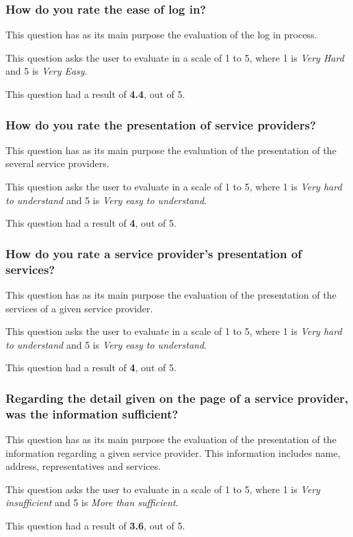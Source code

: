 \subsubsection{How do you rate the ease of log in?}
This question has as its main purpose the evaluation of the log in process. 
\par 
This question asks the user to evaluate in a scale of 1 to 5, where 1 is \textit{Very Hard} and 5 is \textit{Very Easy}. 
\par
This question had a result of \textbf{4.4}, out of 5. 

\subsubsection{How do you rate the presentation of service providers?}
This question has as its main purpose the evaluation of the presentation of the several service providers.
\par 
This question asks the user to evaluate in a scale of 1 to 5, where 1 is \textit{Very hard to understand} and 5 is \textit{Very easy to understand}. 
\par
This question had a result of \textbf{4}, out of 5. 

\subsubsection{How do you rate a service provider's presentation of services?}

This question has as its main purpose the evaluation of the presentation of the services of a given service provider.
\par 
This question asks the user to evaluate in a scale of 1 to 5, where 1 is \textit{Very hard to understand} and 5 is \textit{Very easy to understand}. 
\par
This question had a result of \textbf{4}, out of 5. 

\subsubsection{Regarding the detail given on the page of a service provider, was the information sufficient?}

This question has as its main purpose the evaluation of the presentation of the information regarding a given service provider. This information includes name, address, representatives and services.
\par 
This question asks the user to evaluate in a scale of 1 to 5, where 1 is \textit{Very insufficient} and 5 is \textit{More than sufficient}. 
\par
This question had a result of \textbf{3.6}, out of 5. 

